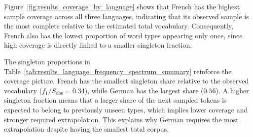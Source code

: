 ﻿\documentclass{article}
\begin{document}
Figure~\ref{fig:results_coverage_by_language} shows that French has the highest sample coverage across all three languages, indicating that its observed sample is the most complete relative to the estimated total vocabulary. Consequently, French also has the lowest proportion of word types appearing only once, since high coverage is directly linked to a smaller singleton fraction.

The singleton proportions in Table~\ref{tab:results_language_frequency_spectrum_summary} reinforce the coverage picture. French has the smallest singleton share relative to the observed vocabulary ($f_1/S_{\mathrm{obs}} = 0.34$), while German has the largest share ($0.56$). A higher singleton fraction means that a larger share of the next sampled tokens is expected to belong to previously unseen types, which implies lower coverage and stronger required extrapolation. This explains why German requires the most extrapolation despite having the smallest total corpus.

\begin{table}[htbp]
    \centering
    \caption{Corpus-level overview of all data sources. Shakespeare is included for context as the written replication baseline and is not part of the spoken-language comparison.}
    \label{tab:results_corpus_overview}
\end{table}
\end{document}
